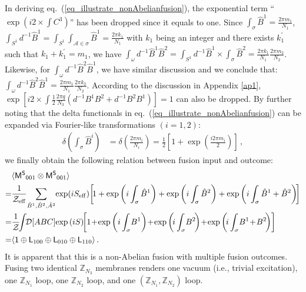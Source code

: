 \documentclass[11pt,nofootinbib,preprint]{revtex4-1}
\begin{document}
In deriving eq.~(\ref{eq_illustrate_nonAbelianfusion}), the exponential term ``$\exp\left(i2\times\int C^3\right)$'' has been dropped since it equals to one. Since $\int_{\sigma}{\hat{B}^1}=\frac{2\pi m_1}{N_1}$, $\int_{S^1}{d^{-1}\hat{B}^1}=\int_{S^1}{\int_{\mathcal{A} \in \sigma}{\hat{B}^1}}=\frac{2\pi k_1}{N_1}$ with $k_1$ being an integer and there exists $k_{1}^{\prime}$ such that $k_1+k_{1}^{\prime}=m_1$, we have 
$	\int_{\omega}{d^{-1}\hat{B}^1\hat{B}^2}=\int_{S^1}{d^{-1}\hat{B}^1}\times \int_{\sigma}{\hat{B}^2}=\frac{2\pi k_1}{N_1}\frac{2\pi m_2}{N_2}
 $. Likewise, for $\int_{\omega}{d^{-1}\hat{B}^2\hat{B}^1}$, we have similar discussion and we conclude that:
 $
	\int_{\omega}{d^{-1}\hat{B}^2\hat{B}^1}=\frac{2\pi m_1}{N_1}\frac{2\pi k_2}{N_2}
 $. According to the discussion in Appendix \ref{ap1},     $\exp \left[ i2\times \int \frac{1}{2}\frac{2\pi q}{N_3}\left( d^{-1}B^1B^2+d^{-1}B^2B^1 \right) \right] =1$ can also be dropped.
 By further noting that the delta functionals in eq.~(\ref{eq_illustrate_nonAbelianfusion}) can be expanded via Fourier-like transformations $(i=1,2)$:
\begin{align}
	\delta \left( \int_{\sigma}{\hat{B}^i} \right) &=\delta \left( \frac{2\pi m_i}{N_i} \right) =\frac{1}{2}\left[ 1+\exp \left( \frac{i2\pi m_i}{2} \right) \right] \,,
\end{align}
we finally    obtain the following relation between fusion input and outcome:
\begin{align}
	&\langle \mathsf{M^S}_{001}\otimes \mathsf{M^S}_{001} \rangle \nonumber\\
	=& \frac{1}{\mathcal{Z}_{\rm eff}}  \!  \sum_{\hat{B}^1,\hat{B}^2,\hat{A}^3} \! \exp \! \left( iS_{\rm eff}\right) \! 
\left[\!  1+\exp \left( i\int_{\sigma}{\hat{B}^1} \right) +\exp \left( i\int_{\sigma}{\hat{B}^2} \right) +\exp \left( i\int_{\sigma}{\hat{B}^1+\hat{B}^2} \right) \! \right] \nonumber
	\\
\!\!=& \frac{1}{\mathcal{Z}}\!\!\int\!\! \mathcal{D} \!\left[ ABC \right]\!\exp \left( iS \right) \!\!
\left[ 1\!+\!\exp \left( i\int_{\sigma}\!{ {B}^1} \right) \!+\!\exp \left(\! i\int_{\sigma}\!{ {B}^2} \!\right) \!+\!\exp \left(\! i\int_{\sigma}\!{ {B}^1\!+\! {B}^2} \!\right) \right] \nonumber
	\\
	=&\langle \mathsf{1}\oplus \mathsf{L}_{100}\oplus \mathsf{L}_{010}\oplus \mathsf{L}_{110} \rangle	\label{equation_Ms001Ms001}\,.
\end{align}
It is apparent that this is a non-Abelian fusion with multiple fusion outcomes. Fusing two identical $\mathbb{Z} _{N_3}$ membranes renders   one  vacuum (i.e., trivial excitation), one $\mathbb{Z} _{N_1}$ loop, one $\mathbb{Z} _{N_2}$ loop, and one $ \left( \mathbb{Z} _{N_1},\mathbb{Z} _{N_2} \right) $ loop. 
\end{document}
